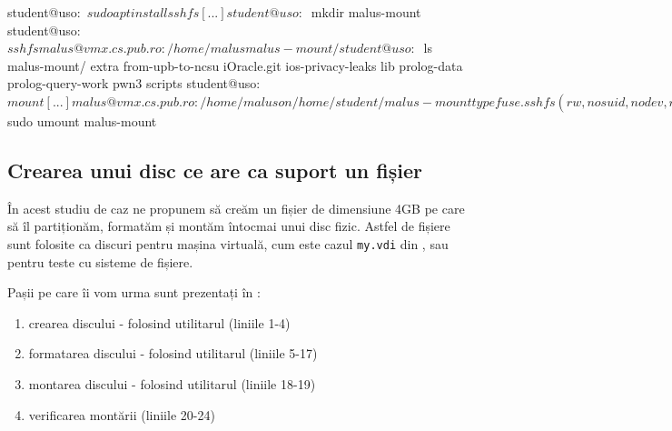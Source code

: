 \begin{screen}[caption={Folosirea sshfs},label={lst:storage:sshfs}]
student@uso:~$ sudo apt install sshfs
[...]
student@uso:~$ mkdir malus-mount
student@uso:~$ sshfs malus@vmx.cs.pub.ro:/home/malus malus-mount/
student@uso:~$ ls malus-mount/
extra  from-upb-to-ncsu  iOracle.git  ios-privacy-leaks  lib  prolog-data  prolog-query-work  pwn3  scripts
student@uso:~$ mount
[...]
malus@vmx.cs.pub.ro:/home/malus on /home/student/malus-mount type fuse.sshfs (rw,nosuid,nodev,relatime,user_id=1000,group_id=1000)
student@uso:~$ sudo umount malus-mount
\end{screen}

\subsection{Crearea unui disc ce are ca suport un fișier}
\label{sec:storage:mount:disk-in-file}

În acest studiu de caz ne propunem să creăm un fișier de dimensiune 4GB pe care să îl partiționăm, formatăm și montăm întocmai unui disc fizic.
Astfel de fișiere sunt folosite ca discuri pentru mașina virtuală, cum este cazul \texttt{my.vdi} din , sau pentru teste cu sisteme de fișiere.

Pașii pe care îi vom urma sunt prezentați în :
\begin{enumerate}
  \item crearea discului - folosind utilitarul  (liniile 1-4)
  \item formatarea discului - folosind utilitarul  (liniile 5-17)
  \item montarea discului - folosind utilitarul  (liniile 18-19)
  \item verificarea montării (liniile 20-24)
\end{enumerate}


